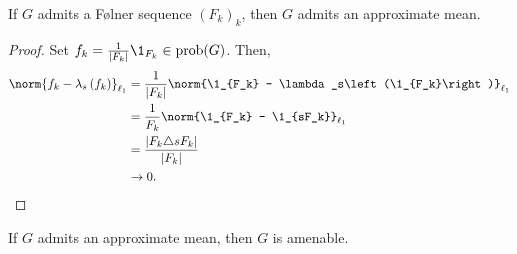 \documentclass[10pt]{mypackage2}
\begin{document}
\begin{proposition}\label{prop:folner_implies_approx_mean}
  If $G$ admits a Følner sequence $\left(F_k\right)_k$, then $G$ admits an approximate mean.
\end{proposition}
\begin{proof}
  Set $f_k = \frac{1}{\left\vert F_k \right\vert}\1_{F_k}\in \operatorname{prob}(G)$. Then,
  \begin{align*}
    \norm{f_k - \lambda_s\left(f_k\right)}_{\ell_1} &= \frac{1}{\left\vert F_k \right\vert} \norm{\1_{F_k} - \lambda_s\left(\1_{F_k}\right)}_{\ell_1}\\
                                                    &= \frac{1}{F_k}\norm{\1_{F_k} - \1_{sF_k}}_{\ell_1}\\
                                               &= \frac{\left\vert F_k\triangle sF_k \right\vert}{\left\vert F_k \right\vert}\\
                                               &\rightarrow 0.
  \end{align*}
\end{proof}
\begin{proposition}\label{prop:approx_mean_implies_amenable}
  If $G$ admits an approximate mean, then $G$ is amenable.
\end{proposition}
\end{document}
